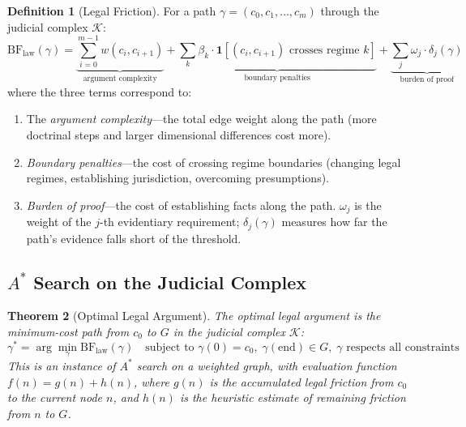 \documentclass[12pt]{article}
\newtheorem{theorem}{Theorem}[section]
\theoremstyle{definition}
\newtheorem{definition}[theorem]{Definition}
\theoremstyle{remark}
\newcommand{\BF}{\mathrm{BF}}
\begin{document}
\begin{definition}[Legal Friction]
\label{def:legal_friction}
For a path $\gamma = (c_0, c_1, \ldots, c_m)$ through the judicial complex $\mathcal{K}$:
\begin{equation}
\BF_{\text{law}}(\gamma) = \underbrace{\sum_{i=0}^{m-1} w(c_i, c_{i+1})}_{\text{argument complexity}} + \underbrace{\sum_k \beta_k \cdot \mathbf{1}[(c_i, c_{i+1}) \text{ crosses regime } k]}_{\text{boundary penalties}} + \underbrace{\sum_j \omega_j \cdot \delta_j(\gamma)}_{\text{burden of proof}}
\label{eq:legal_friction}
\end{equation}
where the three terms correspond to:
\begin{enumerate}
    \item The \emph{argument complexity}---the total edge weight along the path (more doctrinal steps and larger dimensional differences cost more).
    \item \emph{Boundary penalties}---the cost of crossing regime boundaries (changing legal regimes, establishing jurisdiction, overcoming presumptions).
    \item \emph{Burden of proof}---the cost of establishing facts along the path.  $\omega_j$ is the weight of the $j$-th evidentiary requirement; $\delta_j(\gamma)$ measures how far the path's evidence falls short of the threshold.
\end{enumerate}
\end{definition}

\subsection{$A^*$ Search on the Judicial Complex}

\begin{theorem}[Optimal Legal Argument]
\label{thm:optimal_argument}
The optimal legal argument is the minimum-cost path from $c_0$ to $G$ in the judicial complex $\mathcal{K}$:
\begin{equation}
\gamma^* = \arg\min_\gamma \BF_{\text{law}}(\gamma) \quad \text{subject to } \gamma(0) = c_0,\; \gamma(\text{end}) \in G,\; \gamma \text{ respects all constraints}
\label{eq:optimal}
\end{equation}
This is an instance of $A^*$ search \cite{hart1968} on a weighted graph, with evaluation function $f(n) = g(n) + h(n)$, where $g(n)$ is the accumulated legal friction from $c_0$ to the current node $n$, and $h(n)$ is the heuristic estimate of remaining friction from $n$ to $G$.
\end{theorem}
\end{document}
